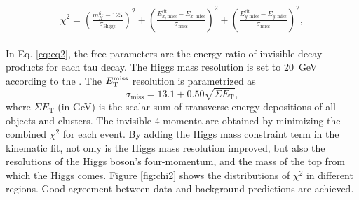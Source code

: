 \begin{eqnarray}
\begin{array}{ll}
\chi^2 = 
\left( \frac{m_{H}^{\text{fit}} - 125}{\sigma_{\text{Higgs}}} \right)^2 + \left( \frac{E_{x,\text{miss}}^{\text{fit}} - E_{x,\text{miss}}}{\sigma_{\text{miss}}} \right)^2 + \left( \frac{E_{y,\text{miss}}^{\text{fit}} - E_{y,\text{miss}}}{\sigma_{\text{miss}}} \right)^2 ,
\end{array}
\label{eq:eq2}
\end{eqnarray}

%

In Eq. \ref{eq:eq2}, the free parameters are the energy ratio of invisible decay products for each tau decay.
The Higgs mass resolution is set to 20~GeV according to the \cite{Htautau}. The $E_{\text{T}}^{\text{miss}}$ resolution is parametrized as
\begin{equation}
\sigma_{\text{miss}}=13.1 + 0.50\sqrt{\Sigma E_\text{T}},
\label{eq:eq7}
\end{equation}
where $\Sigma E_\text{T}$ (in GeV) is the scalar sum of transverse energy depositions of all objects and clusters. The invisible 4-momenta are obtained by minimizing the combined $\chi^2$ for each event. By adding the Higgs mass constraint term in the kinematic fit, not only is the Higgs mass resolution improved, but also the resolutions of the Higgs boson's four-momentum, and the mass of the top from which the Higgs comes. Figure \ref{fig:chi2} shows the distributions of $\chi^2$ in different regions. Good agreement between data and background predictions are achieved.

